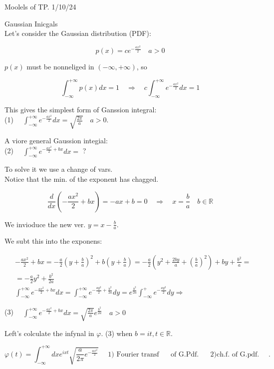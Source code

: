 \documentclass[10pt]{article}
\begin{document}
Moolels of TP. 1/10/24

Gaussian Inicgals\\
Let's consider the Gaussian distribution (PDF):

$$
p(x)=c e^{-\frac{a x^{2}}{2}} \quad a>0
$$

$p(x)$ must be nonneliged in $(-\infty,+\infty)$, so

$$
\int_{-\infty}^{+\infty} p(x) d x=1 \quad \Rightarrow \quad c \int_{-\infty}^{+\infty} e^{-\frac{a x^{2}}{2}} d x=1
$$

This gives the simplest form of Ganssion integral:\\
(1) $\quad \int_{-\infty}^{+\infty} e^{-\frac{a x^{2}}{2}} d x=\sqrt{\frac{2 \pi}{a}} \quad a>0$.

A viore general Gaussion integial:\\
(2) $\quad \int_{-\infty}^{+\infty} e^{-\frac{a x^{2}}{2}+b x} d x=$ ?

To solve it we use a change of vars.\\
Notice that the min. of the exponent has chagged.

$$
\frac{d}{d x}\left(-\frac{a x^{2}}{2}+b x\right)=-a x+b=0 \quad \Rightarrow \quad x=\frac{b}{a} \quad b \in \mathbb{R}
$$

We invioduce the new ver. $y=x-\frac{b}{a}$.

We subt this into the exponens:

$$
\begin{aligned}
&-\frac{a x^{2}}{2}+b x=-\frac{a}{2}\left(y+\frac{b}{a}\right)^{2}+b\left(y+\frac{b}{a}\right)=-\frac{a}{2}\left(y^{2}+\frac{2 b y}{a}+\left(\frac{b}{a}\right)^{2}\right)+b y+\frac{b^{2}}{a}= \\
&=-\frac{a}{2} y^{2}+\frac{b^{2}}{2 a} \\
& \int_{-\infty}^{+\infty} e^{-\frac{a x^{2}}{2}+b x} d x=\int_{-\infty}^{+\infty} e^{-\frac{a y^{2}}{2}+\frac{b^{2}}{2 a}} d y=e^{\frac{b^{2}}{2 a}} \int_{-\infty}^{+} e^{-\frac{a y^{2}}{2}} d y \Rightarrow
\end{aligned}
$$

(3) $\quad \int_{-\infty}^{+\infty} e^{-\frac{a x^{2}}{2}+b x} d x=\sqrt{\frac{2 \pi}{a}} e^{\frac{b^{2}}{2 a}} \quad a>0$

Left's colculate the infynal in $\varphi$. (3) when $b=i t, t \in \mathbb{R}$.

$$
\varphi(t)=\int_{-\infty}^{+\infty} d x e^{i x t} \sqrt{\frac{a}{2 \pi} e^{-\frac{a x^{2}}{2}}} \quad \text { 1) Fourier transf } \quad \text { of G.Pdf. } \quad \text { 2)ch.f. of G.pdf. } \quad .
$$
\end{document}
